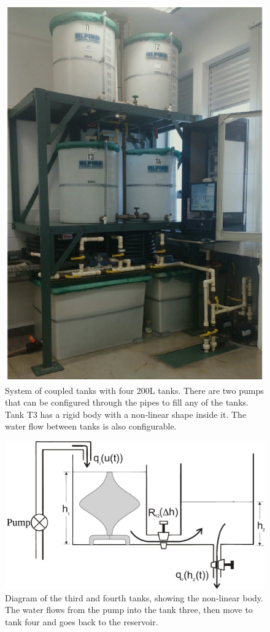 \begin{figure}[ht!]
  \centering
  \includegraphics[height=.5\textheight]{imgs/tanks-real}
  \caption[System of coupled tanks.]{System of coupled tanks with four 200L
    tanks. There are two pumps that can be configured through the pipes to fill
    any of the tanks. Tank T3 has a rigid body with a non-linear shape inside
    it. The water flow between tanks is also configurable.}%
  \label{fig:tanks-real}
\end{figure}

\begin{figure}[ht!]
  \centering
  \includegraphics[width=0.9\linewidth]{imgs/tanks}
  \caption[Coupled tanks diagram.]{Diagram of the third and fourth tanks,
    showing the non-linear body. The water flows from the pump into the tank
    three, then move to tank four and goes back to the reservoir.}%
  \label{fig:tanks}
\end{figure}

